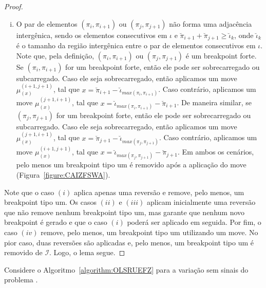 \begin{proof}
\begin{enumerate}[i.]
  \item O par de elementos $(\pi_{i},\pi_{i+1})$ ou $(\pi_{j},\pi_{j+1})$ não forma uma adjacência intergênica, sendo os elementos consecutivos em $\iota$ e $\breve\pi_{i+1} + \breve\pi_{j+1} \ge \breve\iota_k$, onde $\breve\iota_k$ é o tamanho da região intergênica entre o par de elementos consecutivos em $\iota$. Note que, pela definição, $(\pi_{i},\pi_{i+1})$ ou $(\pi_{j},\pi_{j+1})$ é um breakpoint forte. Se $(\pi_{i},\pi_{i+1})$ for um breakpoint forte, então ele pode ser sobrecarregado ou subcarregado. Caso ele seja sobrecarregado, então aplicamos um move $\mu^{(i+1,j+1)}_{(x)}$, tal que $x = \breve\pi_{i+1} - \breve\iota_{max(\pi_{i},\pi_{i+1})}$. Caso contrário, aplicamos um move $\mu^{(j+1,i+1)}_{(x)}$, tal que $x = \breve\iota_{max(\pi_{i},\pi_{i+1})} - \breve\pi_{i+1}$. De maneira similar, se $(\pi_{j},\pi_{j+1})$ for um breakpoint forte, então ele pode ser sobrecarregado ou subcarregado. Caso ele seja sobrecarregado, então aplicamos um move $\mu^{(j+1,i+1)}_{(x)}$, tal que $x = \breve\pi_{j+1} - \breve\iota_{max(\pi_{j},\pi_{j+1})}$. Caso contrário, aplicamos um move $\mu^{(i+1,j+1)}_{(x)}$, tal que $x = \breve\iota_{max(\pi_{j},\pi_{j+1})} - \breve\pi_{j+1}$. Em ambos os cenários, pelo menos um breakpoint tipo um é removido após a aplicação do move (Figura~\ref{figure:CAIZFSWA}).
\end{enumerate}
Note que o caso $(i)$ aplica apenas uma reversão e remove, pelo menos, um breakpoint tipo um. Os casos $(ii)$ e $(iii)$ aplicam inicialmente uma reversão que não remove nenhum breakpoint tipo um, mas garante que nenhum novo breakpoint é gerado e que o caso $(i)$ poderá ser aplicado em seguida. Por fim, o caso $(iv)$ remove, pelo menos, um breakpoint tipo um utilizando um move. No pior caso, duas reversões são aplicadas e, pelo menos, um breakpoint tipo um é removido de $\mathcal{I}$. Logo, o lema segue. 
\end{proof}



Considere o Algoritmo~\ref{algorithm:OLSRUEFZ} para a variação sem sinais do problema \SbIRM{}.  



